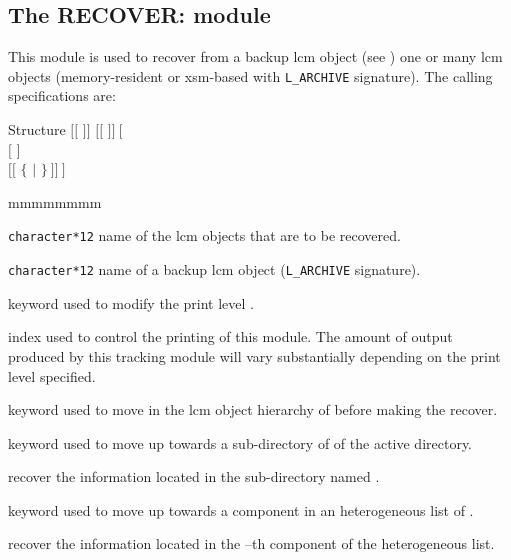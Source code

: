 \clearpage

\subsection{The RECOVER: module}\label{sect:RECOVERData}

This module is used to recover from a backup {\sc lcm} object (see
) one or many {\sc lcm} objects (memory-resident or {\sc xsm}-based with {\tt L\_ARCHIVE} signature).
The calling specifications are:

\begin{DataStructure}{Structure }
$[[$  $]]$ \moc{:=}   $[[$  $]]~[$ \moc{::} \\
$[$   $]$ \\
$[[$  $\{$   $|$   $\}~]]~]$ \moc{;}
\end{DataStructure}

\begin{ListeDeDescription}{mmmmmmmm}

\item[\dusa{NAME1}] {\tt character*12} name of the {\sc lcm} objects that are to
be recovered.

\item[\dusa{NAME2}] {\tt character*12} name of a backup {\sc lcm} object ({\tt L\_ARCHIVE} signature).

\item[\moc{EDIT}] keyword used to modify the print level .

\item[\dusa{iprint}] index used to control the printing of this module. The
amount of output produced by this tracking module will vary substantially
depending on the print level specified.

\item[\moc{STEP}] keyword used to move in the {\sc lcm} object hierarchy of  before making the recover.

\item[\moc{UP}] keyword used to move up towards a sub-directory of  of the
active directory.

\item[\dusa{NOMDIR}] recover the information located in the sub-directory named .

\item[\moc{AT}] keyword used to move up towards a component in an heterogeneous list of .

\item[\dusa{index}] recover the information located in the --th component of the heterogeneous list.

\end{ListeDeDescription}

